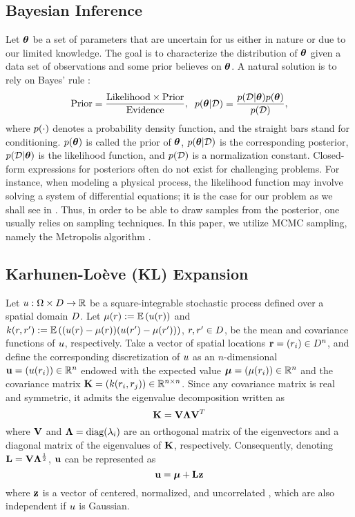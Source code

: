 \subsection{Bayesian Inference} 
Let ${\boldsymbol\theta}$ be a set of parameters that are uncertain for us either in nature or due to our limited knowledge. The goal is to characterize the distribution of ${\boldsymbol\theta}$ given a data set of observations and some prior believes on ${\boldsymbol\theta}$. A natural solution is to rely on Bayes' rule \cite{gelman2004}:
\begin{equation} \elabel{bayes}
  \text{Prior} = \frac{\text{Likelihood} \times \text{Prior}}{\text{Evidence}}, \;\; \f{\vparam | \Data} = \frac{\f{\Data | \vparam} \f{\vparam}}{\f{\Data}},
\end{equation}
where $\f{\cdot}$ denotes a probability density function, and the straight bars stand for conditioning. $\f{\vparam}$ is called the prior of ${\boldsymbol\theta}$, $\f{\vparam | \Data}$ is the corresponding posterior, $\f{\Data | \vparam}$ is the likelihood function, and $\f{\Data}$ is a normalization constant. Closed-form expressions for posteriors often do not exist for challenging problems. For instance, when modeling a physical process, the likelihood function may involve solving a system of differential equations; it is the case for our problem as we shall see in . Thus, in order to be able to draw samples from the posterior, one usually relies on sampling techniques. In this paper, we utilize MCMC sampling, namely the Metropolis algorithm \cite{gelman2004}.

\subsection{Karhunen-Lo\`{e}ve (KL) Expansion} 
Let $u: \Omega \times D \to \mathbb{R}$ be a square-integrable stochastic process defined over a spatial domain $D$. Let $\fMean{\r} := \E{\u(\r)}$ and $\fCov{\r, \r'} := \E{(\u(\r) - \fMean{\r}) (\u(\r') - \fMean{\r'})}$, $r, r' \in D$, be the mean and covariance functions of $u$, respectively. Take a vector of spatial locations $\mathbf{r} = (r_i) \in D^n$, and define the corresponding discretization of $u$ as an $n$-dimensional \rv\ $\mathbf{u} = (u(r_i)) \in \mathbb{R}^n$ endowed with the expected value $\vmean = (\fMean{\r_i}) \in \real^n$ and the covariance matrix $\mCov = (\fCov{\r_i, \r_j}) \in \real^{n \times n}$. Since any covariance matrix is real and symmetric, it admits the eigenvalue decomposition \cite{press2007} written as
\[
  \mathbf{K} = \mathbf{V} \mathbf{\Lambda} \mathbf{V}^T
\]
where $\mathbf{V}$ and $\mathbf{\Lambda} = \text{diag}(\lambda_i)$ are an orthogonal matrix of the eigenvectors and a diagonal matrix of the eigenvalues of $\mathbf{K}$, respectively. Consequently, denoting $\mathbf{L} = \mathbf{V} \mathbf{\Lambda}^\frac{1}{2}$, $\mathbf{u}$ can be represented as
\begin{equation} \elabel{kl-expansion}
  \vu = \vmean + \mKL \vz
\end{equation}
where $\mathbf{z}$ is a vector of centered, normalized, and uncorrelated \rvs, which are also independent if $u$ is Gaussian.

